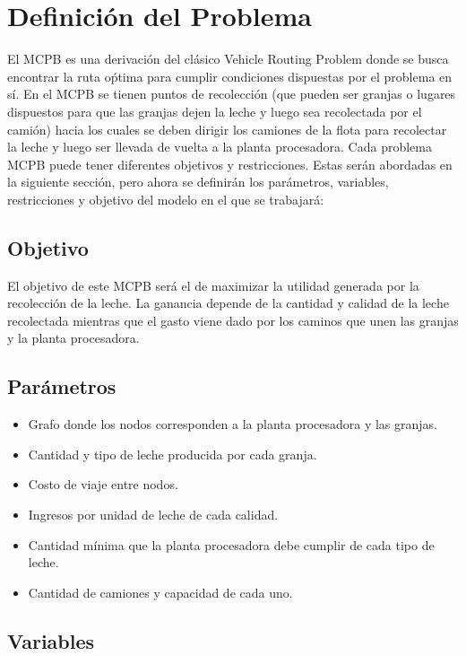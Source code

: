 \documentclass[letter, 10pt]{article}
\begin{document}
\section{Definici\'on del Problema}

El MCPB es una derivaci\'on del cl\'asico Vehicle Routing Problem donde se busca encontrar la ruta o\'ptima para cumplir condiciones dispuestas por el problema en s\'i. En el MCPB se tienen puntos de recolecci\'on (que pueden ser granjas o lugares dispuestos para que las granjas dejen la leche y luego sea recolectada por el cami\'on) hacia los cuales se deben dirigir los camiones de la flota para recolectar la leche y luego ser llevada de vuelta a la planta procesadora. Cada problema MCPB puede tener diferentes objetivos y restricciones. Estas ser\'an abordadas en la siguiente secci\'on, pero ahora se definir\'an los par\'ametros, variables, restricciones y objetivo del modelo en el que se trabajar\'a:

\subsection{Objetivo}

El objetivo de este MCPB ser\'a el de maximizar la utilidad generada por la recolecci\'on de la leche. La ganancia depende de la cantidad y calidad de la leche recolectada mientras que el gasto viene dado por los caminos que unen las granjas y la planta procesadora.

\subsection{Par\'ametros}

\begin{itemize}
    \item Grafo donde los nodos corresponden a la planta procesadora y las granjas.
    \item Cantidad y tipo de leche producida por cada granja.
    \item Costo de viaje entre nodos.
    \item Ingresos por unidad de leche de cada calidad.
    \item Cantidad m\'inima que la planta procesadora debe cumplir de cada tipo de leche.
    \item Cantidad de camiones y capacidad de cada uno.
\end{itemize}

\subsection{Variables}
\end{document}
